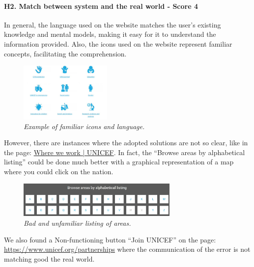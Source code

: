 \paragraph{H2. Match between system and the real world - Score 4} \label{subsec:H2}	In general, the language used on the website matches the user’s existing knowledge and mental models, making it easy for it to understand the information provided. Also, the icons used on the website represent familiar concepts, facilitating the comprehension.
\begin{figure}[!h]
	\begin{center}
		\includegraphics[width=0.4\textwidth]{FinalScores4.jpg}
		\captionsetup{font=small}
		\caption{\textit{Example of familiar icons and language.}}
	\end{center}
\end{figure}
\newline However, there are instances where the adopted solutions are not so clear, like in the page: \href{https://www.unicef.org/where-we-work}{Where we work | UNICEF}. In fact, the “Browse areas by alphabetical listing” could be done much better with a graphical representation of a map where you could click on the nation.
\begin{figure}[!h]
	\begin{center}
		\includegraphics[width=0.7\textwidth]{FinalScores5.jpg}
		\captionsetup{font=small}
		\caption{\textit{Bad and unfamiliar listing of areas.}}
	\end{center}
\end{figure}
\newline We also found a Non-functioning button “Join UNICEF” on the page: 
\newline \href{https://www.unicef.org/partnerships}{https://www.unicef.org/partnerships} where the communication of the error is not matching good the real world.
\newline
